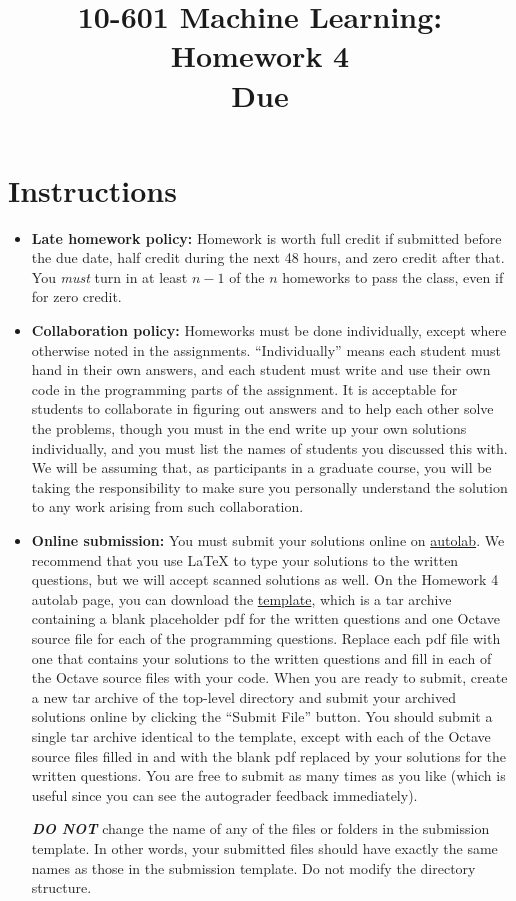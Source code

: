 \documentclass{article}
\title{
  10-601 Machine Learning: Homework 4\\
  \vspace{0.2cm}
  \large{
    Due \duedate{}
  }
}
\date{}
\author{}
\begin{document}
\maketitle

\section*{Instructions}
\begin{itemize}
\item {\bf Late homework policy:} Homework is worth full credit if
  submitted before the due date, half credit during the next 48 hours,
  and zero credit after that.  You {\em must} turn in at least $n-1$
  of the $n$ homeworks to pass the class, even if for zero credit.
\item {\bf Collaboration policy:} Homeworks must be done individually,
  except where otherwise noted in the assignments. ``Individually''
  means each student must hand in their own answers, and each student
  must write and use their own code in the programming parts of the
  assignment. It is acceptable for students to collaborate in figuring
  out answers and to help each other solve the problems, though you
  must in the end write up your own solutions individually, and you
  must list the names of students you discussed this with.  We will be
  assuming that, as participants in a graduate course, you will be
  taking the responsibility to make sure you personally understand the
  solution to any work arising from such collaboration.

\item {\bf Online submission:} You must submit your solutions online
  on
  \href{https://autolab.cs.cmu.edu/courses/27/assessments/292}{autolab}. We
  recommend that you use \LaTeX{} to type your solutions to the
  written questions, but we will accept scanned solutions as well. On
  the Homework 4 autolab page, you can download the
  \href{https://autolab.cs.cmu.edu/courses/27/assessments/292/attachments/20}{template},
  which is a tar archive containing a blank placeholder pdf for the
  written questions and one Octave source file for each of the
  programming questions. Replace each pdf file with one that contains
  your solutions to the written questions and fill in each of the Octave source
  files with your code. When you are ready to submit, create a new tar archive of the
  top-level directory and submit your archived solutions online by
  clicking the ``Submit File'' button. You should submit a single tar
  archive identical to the template, except with each of the Octave
  source files filled in and with the blank pdf replaced by your
  solutions for the written questions. You are free to submit as many
  times as you like (which is useful since you can see the autograder
  feedback immediately).

  \textbf{\emph{DO NOT}} change the name of any of the files or
  folders in the submission template. In other words, your submitted
  files should have exactly the same names as those in the submission
  template. Do not modify the directory structure.
\end{itemize}
\end{document}
